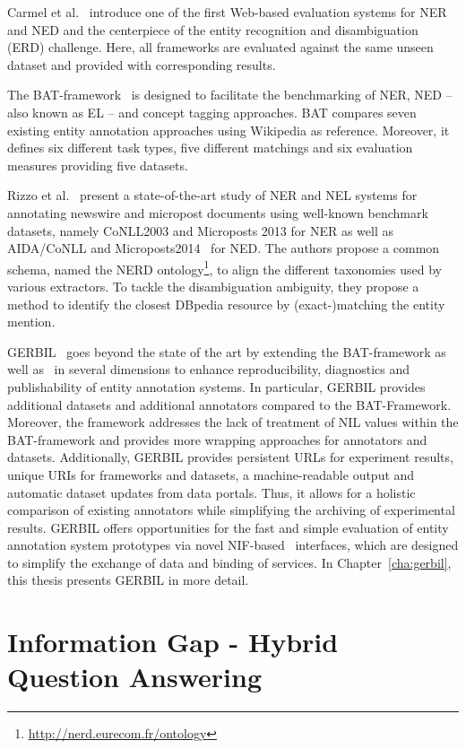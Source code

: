 Carmel et al.~\cite{ERD2014} introduce one of the first Web-based evaluation systems for NER and NED and the centerpiece of the entity recognition and disambiguation (ERD) challenge. 
Here, all frameworks are evaluated against the same unseen dataset and provided with corresponding results. 

The BAT-framework~\cite{cornolti} is designed to facilitate the benchmarking of \ac{NER}, \ac{NED} -- also known as \ac{EL} -- and concept tagging approaches.
BAT compares seven existing entity annotation approaches using Wikipedia as reference.
Moreover, it defines six different task types, five different matchings and six evaluation measures providing five datasets.

Rizzo et al.~\cite{rizzo2014}  present a state-of-the-art study of NER and NEL systems for annotating newswire and micropost documents using well-known benchmark datasets, namely CoNLL2003 and Microposts 2013 for NER as well as AIDA/CoNLL and Microposts2014~\cite{Cano2014} for NED. 
The authors propose a common schema, named the NERD ontology\footnote{\url{http://nerd.eurecom.fr/ontology}}, to align the different taxonomies used by various extractors. To tackle the disambiguation ambiguity, they propose a method to identify the closest DBpedia resource by (exact-)matching the entity mention.

GERBIL~\cite{GERBIL} goes beyond the state of the art by extending the BAT-framework as well as~\cite{rizzo2014} in several dimensions to enhance reproducibility, diagnostics and publishability of entity annotation systems. 
In particular, GERBIL provides \numberOfadditionalDatasets additional datasets and \numberOfadditionalAnnotators additional annotators compared to the BAT-Framework. 
Moreover, the framework addresses the lack of treatment of NIL values within the BAT-framework and provides more wrapping approaches for annotators and datasets. 
Additionally, GERBIL provides persistent URLs for experiment results, unique URIs for frameworks and datasets, a machine-readable output and automatic dataset updates from data portals. 
Thus, it allows for a holistic comparison of existing annotators while simplifying the archiving of experimental results. 
GERBIL offers opportunities for the fast and simple evaluation of entity annotation system prototypes via novel NIF-based~\cite{NIF} interfaces, which are designed to simplify the exchange of data and binding of services.
In Chapter~\ref{cha:gerbil}, this thesis presents GERBIL in more detail.

\section{Information Gap - Hybrid Question Answering}

